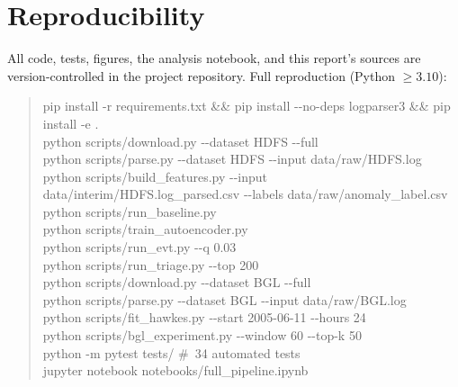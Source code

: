 \documentclass[11pt,a4paper]{report}
\begin{document}
\chapter{Reproducibility}
\label{app:repro}
All code, tests, figures, the analysis notebook, and this report's sources
are version-controlled in the project repository. Full reproduction
(Python $\ge3.10$):
\begin{quote}\small\ttfamily
pip install -r requirements.txt \&\& pip install -{}-no-deps logparser3
\&\& pip install -e .\\[2pt]
python scripts/download.py -{}-dataset HDFS -{}-full\\
python scripts/parse.py -{}-dataset HDFS -{}-input data/raw/HDFS.log\\
python scripts/build\_features.py -{}-input
data/interim/HDFS.log\_parsed.csv -{}-labels data/raw/anomaly\_label.csv\\
python scripts/run\_baseline.py\\
python scripts/train\_autoencoder.py\\
python scripts/run\_evt.py -{}-q 0.03\\
python scripts/run\_triage.py -{}-top 200\\[2pt]
python scripts/download.py -{}-dataset BGL -{}-full\\
python scripts/parse.py -{}-dataset BGL -{}-input data/raw/BGL.log\\
python scripts/fit\_hawkes.py -{}-start 2005-06-11 -{}-hours 24\\
python scripts/bgl\_experiment.py -{}-window 60 -{}-top-k 50\\[2pt]
python -m pytest tests/ \qquad\#\ 34 automated tests\\
jupyter notebook notebooks/full\_pipeline.ipynb
\end{quote}
\end{document}
